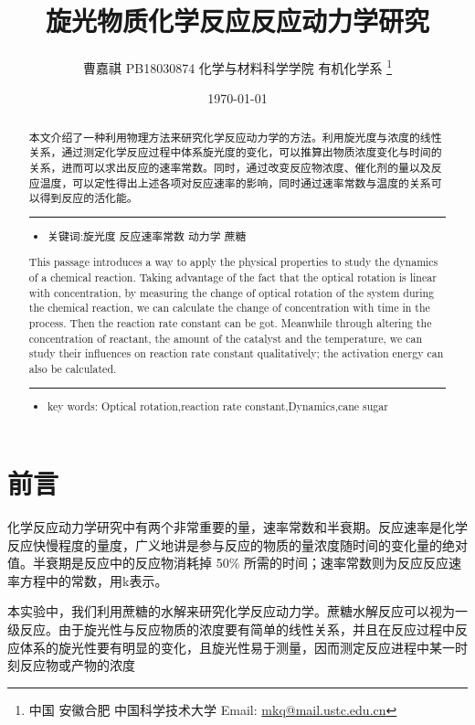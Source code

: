 \documentclass[11pt]{report}
\author{曹嘉祺 PB18030874 化学与材料科学学院 有机化学系 \thanks{中国 安徽合肥 中国科学技术大学 Email: \href{mailto:mkq@mail.ustc.edu.cn}{mkq@mail.ustc.edu.cn}}}
\date{\today}
\title{旋光物质化学反应反应动力学研究}
\begin{document}
\maketitle
\tableofcontents

\begin{abstract}
本文介绍了一种利用物理方法来研究化学反应动力学的方法。利用旋光度与浓度的线性关系，通过测定化学反应过程中体系旋光度的变化，可以推算出物质浓度变化与时间的关系，进而可以求出反应的速率常数。同时，通过改变反应物浓度、催化剂的量以及反应温度，可以定性得出上述各项对反应速率的影响，同时通过速率常数与温度的关系可以得到反应的活化能。


\noindent\rule{\textwidth}{0.5pt}
\begin{itemize}
\item 关键词:旋光度 \quad   反应速率常数 \quad      动力学 \quad       蔗糖
\end{itemize}
\end{abstract}
\begin{abstract}
This passage introduces a way to apply the physical properties to study the dynamics of a chemical reaction. Taking advantage of the fact that the optical rotation is linear with concentration, by measuring the change of optical rotation of the system during the chemical reaction, we can calculate the change of concentration with time in the process. Then the reaction rate constant can be got. Meanwhile through altering the concentration of reactant, the amount of the catalyst and the temperature, we can study their influences on reaction rate constant qualitatively; the activation energy can also be calculated.


\noindent\rule{\textwidth}{0.5pt}

\begin{itemize}
\item key words: Optical rotation,reaction rate constant,Dynamics,cane sugar
\end{itemize}
\end{abstract}
\part{前言}
\label{sec:org62cc131}
化学反应动力学研究中有两个非常重要的量，速率常数和半衰期。反应速率是化学反应快慢程度的量度，广义地讲是参与反应的物质的量浓度随时间的变化量的绝对值。半衰期是反应中的反应物消耗掉 50\% 所需的时间；速率常数则为反应反应速率方程中的常数，用k表示。

本实验中，我们利用蔗糖的水解来研究化学反应动力学。蔗糖水解反应可以视为一级反应。由于旋光性与反应物质的浓度要有简单的线性关系，并且在反应过程中反应体系的旋光性要有明显的变化，且旋光性易于测量，因而测定反应进程中某一时刻反应物或产物的浓度
\end{document}

